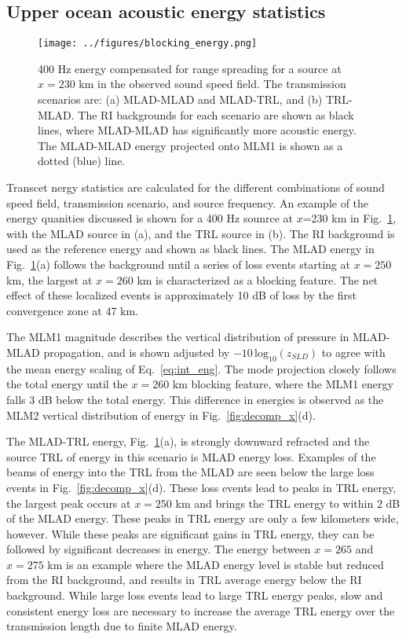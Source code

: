 \documentclass[preprint,NumberedRefs]{JASA}
\begin{document}
\subsection{Upper ocean acoustic energy statistics}\label{ssec:energy}
\begin{figure}
\texttt{[image: ../figures/blocking\_energy.png]}
    \caption{400 Hz energy compensated for range spreading for a source at $x=230$ km in the observed sound speed field. The transmission scenarios are: (a) MLAD-MLAD and MLAD-TRL, and (b) TRL-MLAD. The RI backgrounds for each scenario are shown as black lines, where MLAD-MLAD has significantly more acoustic energy. The MLAD-MLAD energy projected onto MLM1 is shown as a dotted (blue) line.}
    \label{fig:ml_energy}
\end{figure}
Transcet nergy statistics are calculated for the different combinations of sound speed field, transmission scenario, and source frequency. An example of the energy quanities discussed is shown for a 400 Hz sounrce at $x$=230 km in Fig.~\ref{fig:ml_energy}, with the MLAD source in (a), and the TRL source in (b). The RI background is used as the reference energy and shown as black lines. The MLAD energy in Fig.~\ref{fig:ml_energy}(a) follows the background until a series of loss events starting at $x=250$ km, the largest at $x=260$ km is characterized as a blocking feature. The net effect of these localized events is approximately 10 dB of loss by the first convergence zone at 47 km.

The MLM1 magnitude describes the vertical distribution of pressure in MLAD-MLAD propagation, and is shown adjusted by $-10 \, \textrm{log}_{10}(z_{SLD})$ to agree with the mean energy scaling of Eq.~\eqref{eq:int_eng}. The mode projection closely follows the total energy until the $x=260$ km blocking feature, where the MLM1 energy falls 3 dB below the total energy. This difference in energies is observed as the MLM2 vertical distribution of energy in Fig.~\ref{fig:decomp_x}(d).

The MLAD-TRL energy, Fig.~\ref{fig:ml_energy}(a), is strongly downward refracted and the source TRL of energy in this scenario is MLAD energy loss. Examples of the beams of energy into the TRL from the MLAD are seen below the large loss events in Fig.~\ref{fig:decomp_x}(d). These loss events lead to peaks in TRL energy, the largest peak occurs at $x=250$ km and brings the TRL energy to within 2 dB of the MLAD energy. These peaks in TRL energy are only a few kilometers wide, however. While these peaks are significant gains in TRL energy, they can be followed by significant decreases in energy. The energy between $x=265$ and $x=275$ km is an example where the MLAD energy level is stable but reduced from the RI background, and results in TRL average energy below the RI background. While large loss events lead to large TRL energy peaks, slow and consistent energy loss are necessary to increase the average TRL energy over the transmission length due to finite MLAD energy.
\end{document}
